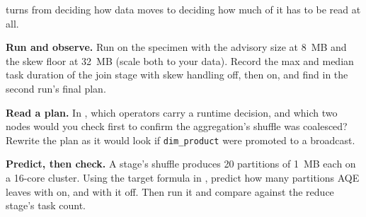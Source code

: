  turns from deciding how data moves to deciding how much of it
has to be read at all.

\exercisehead
\begin{exercises}
\item \textbf{Run and observe.} Run  on the
      specimen with the advisory size at 8~MB and the skew floor at 32~MB
      (scale both to your data). Record the max and median task duration of the
      join stage with skew handling off, then on, and find
       in the second run's final plan.
\item \textbf{Read a plan.} In , which operators carry
      a runtime decision, and which two nodes would you check first to confirm
      the aggregation's shuffle was coalesced? Rewrite the plan as it would
      look if \texttt{dim\_product} were promoted to a broadcast.
\item \textbf{Predict, then check.} A stage's shuffle produces 20 partitions of
      1~MB each on a 16-core cluster. Using the target formula in
      , predict how many partitions AQE leaves with
       on, and with it off. Then run it and compare
      against the reduce stage's task count.
\end{exercises}
